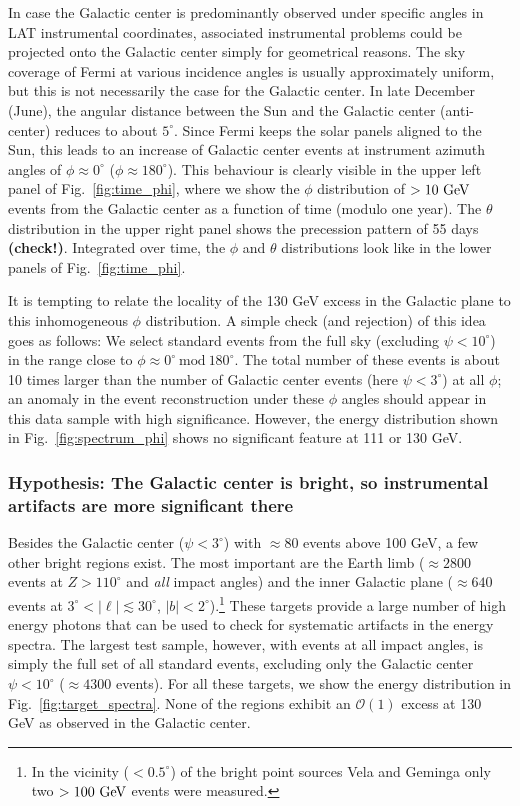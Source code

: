 \documentclass[aps,twocolumn,prd,superscriptaddress,showpacs,nofootinbib,fixfloat]{revtex4}
\newcommand{\GeV}{{\rm ~GeV}}
\begin{document}
In case the Galactic center is predominantly observed under specific angles in
LAT instrumental coordinates, associated instrumental problems could be
projected onto the Galactic center simply for geometrical reasons. The sky
coverage of Fermi at various incidence angles is usually approximately uniform,
but this is not necessarily the case for the Galactic center.  In late December
(June), the angular distance between the Sun and the Galactic center
(anti-center) reduces to about $5^\circ$.  Since Fermi keeps the solar panels
aligned to the Sun, this leads to an increase of Galactic center events at
instrument azimuth angles of $\phi\approx 0^\circ$ ($\phi\approx 180^\circ$).
This behaviour is clearly visible in the upper left panel of Fig.~\ref{fig:time_phi}, where we show
the $\phi$ distribution of $>10\GeV$ events from the Galactic center as
a function of time (modulo one year).  The $\theta$ distribution in the upper
right panel shows the precession pattern of 55 days \textbf{(check!)}.
Integrated over time, the $\phi$ and $\theta$ distributions look like in the
lower panels of Fig.~\ref{fig:time_phi}.

It is tempting to relate the locality of the 130 GeV excess in the Galactic
plane to this inhomogeneous $\phi$ distribution. A simple check (and
rejection) of this idea goes as follows: We select standard events from the
full sky (excluding $\psi < 10^\circ$) in the range close to $\phi\approx
0^\circ\ \text{mod}\ 180^\circ$. The total number of these events is about 10
times larger than the number of Galactic center events (here $\psi<3^\circ$)
at all $\phi$; an anomaly in the event reconstruction under these $\phi$
angles should appear in this data sample with high significance. However, the
energy distribution shown in Fig.~\ref{fig:spectrum_phi} shows no significant
feature at 111 or 130 GeV.

\subsubsection{Hypothesis: The Galactic center is bright, so instrumental
artifacts are more significant there}

Besides the Galactic center ($\psi<3^\circ$) with $\approx80$ events above 100
GeV, a few other bright regions exist.  The most important are the Earth limb
($\approx2800$ events at $Z>110^\circ$ and \emph{all} impact angles) and the
inner Galactic plane ($\approx640$ events at $3^\circ<|\ell|\lesssim30^\circ$,
$|b|<2^\circ$).\footnote{In the vicinity ($<0.5^\circ$) of the bright point
sources Vela and Geminga only two $>100\GeV$ events were measured.} These
targets provide a large number of high energy photons that can be used to
check for systematic artifacts in the energy spectra. The largest test sample,
however, with events at all impact angles, is simply the full set of all
standard events, excluding only the Galactic center $\psi<10^\circ$ ($\approx
4300$ events). For all these targets, we show the energy distribution in
Fig.~\ref{fig:target_spectra}.  None of the regions exhibit an
$\mathcal{O}(1)$ excess at 130 GeV as observed in the Galactic center.
\end{document}
